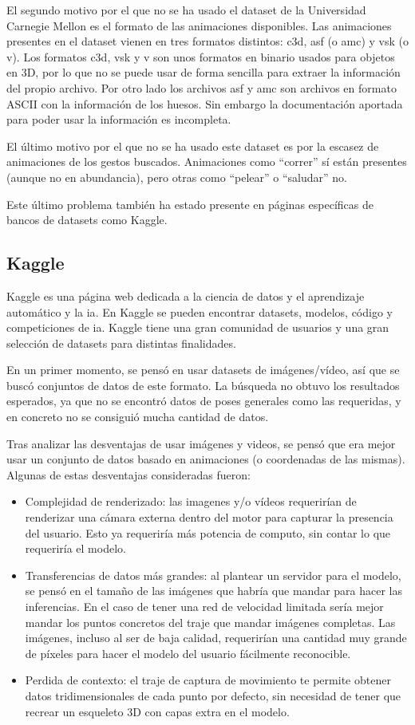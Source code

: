 El segundo motivo por el que no se ha usado el dataset de la Universidad Carnegie Mellon es el formato de las animaciones disponibles.
Las animaciones presentes en el dataset vienen en tres formatos distintos: c3d, asf (o amc) y vsk (o v).
Los formatos c3d, vsk y v son unos formatos en binario usados para objetos en 3D, por lo que no se puede usar de forma sencilla para extraer la información del propio archivo.
Por otro lado los archivos asf y amc son archivos en formato ASCII con la información de los huesos. Sin embargo la documentación aportada para poder usar la información es incompleta.

El último motivo por el que no se ha usado este dataset es por la escasez de animaciones de los gestos buscados.
Animaciones como ``correr'' sí están presentes (aunque no en abundancia), pero otras como ``pelear'' o ``saludar'' no.

Este último problema también ha estado presente en páginas específicas de bancos de datasets como Kaggle.

\subsection{Kaggle}

Kaggle es una página web dedicada a la ciencia de datos y el aprendizaje automático y la \gls{ia}. En Kaggle se pueden encontrar datasets, modelos, código y competiciones de \gls{ia}. Kaggle tiene una gran comunidad de usuarios y una gran selección de datasets para distintas finalidades.

En un primer momento, se pensó en usar datasets de imágenes/vídeo, así que se buscó conjuntos de datos de este formato. La búsqueda no obtuvo los resultados esperados, ya que no se encontró datos de poses generales como las requeridas, y en concreto no se consiguió mucha cantidad de datos.

Tras analizar las desventajas de usar imágenes y videos, se pensó que era mejor usar un conjunto de datos basado en animaciones (o coordenadas de las mismas). Algunas de estas desventajas consideradas fueron:
\begin{itemize}
    \item Complejidad de renderizado: las imagenes y/o vídeos requerirían de renderizar una cámara externa dentro del motor para capturar la presencia del usuario. Esto ya requeriría más potencia de computo, sin contar lo que requeriría el modelo.
    \item Transferencias de datos más grandes: al plantear un servidor para el modelo, se pensó en el tamaño de las imágenes que habría que mandar para hacer las inferencias. En el caso de tener una red de velocidad limitada sería mejor mandar los puntos concretos del traje que mandar imágenes completas. Las imágenes, incluso al ser de baja calidad, requerirían una cantidad muy grande de píxeles para hacer el modelo del usuario fácilmente reconocible.
    \item Perdida de contexto: el traje de captura de movimiento te permite obtener datos tridimensionales de cada punto por defecto, sin necesidad de tener que recrear un esqueleto 3D con capas extra en el modelo.
\end{itemize}

